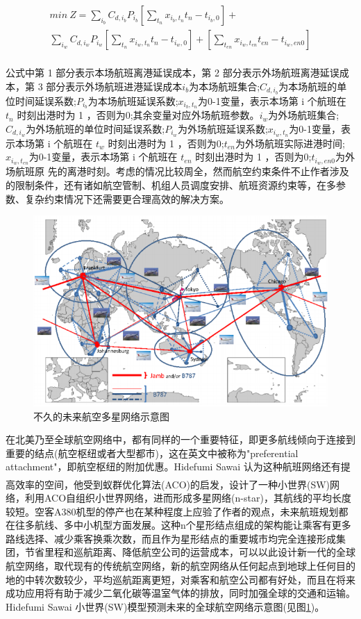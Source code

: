\documentclass[runningheads]{llncs}
\newcommand{\upcite}[1]{\textsuperscript{\textsuperscript{\cite{#1}}}}
\begin{document}
\begin{multline*}
   min\ Z = \sum_{i_b}C_{d,i_b}P_{i_b}\left[\sum_{t_n}x_{i_b,t_n}t_n-t_{i_b,0}\right]+ \\ \sum_{i_w}C_{d,i_w}P_{i_w}\left[\sum_{t_n}x_{i_w,t_n}t_n-t_{i_w,0}\right]+\left[\sum_{t_{en}}x_{i_w,t_{en}}t_{en}-t_{i_w,en0}\right] \\
\end{multline*}  

公式中第 1 部分表示本场航班离港延误成本，第 2 部分表示外场航班离港延误成本，第 3 部分表示外场航班进港延误成本$i_b$为本场航班集合;$C_{d,i_b}$为本场航班的单位时间延误系数;$P_{i_b}$为本场航班延误系数;$x_{i_b,t_n}$为0-1变量，表示本场第 i 个航班在 $t_n$ 时刻出港时为 1 ，否则为0;其余变量对应外场航班参数。$i_w$为外场航班集合;$C_{d,i_w}$为外场航班的单位时间延误系数;$P_{i_w}$为外场航班延误系数;$x_{i_w,t_n}$为0-1变量，表示本场第 i 个航班在 $t_w$ 时刻出港时为 1 ，否则为0;$t_{en}$为外场航班实际进港时间;$x_{i_w,t_{en}}$为0-1变量，表示本场第 i 个航班在 $t_{en}$ 时刻出港时为 1 ，否则为0;$t_{i_w,en0}$为外场航班原 先的离港时刻。考虑的情况比较周全，然而航空约束条件不止作者涉及的限制条件，还有诸如航空管制、机组人员调度安排、航班资源约束等，在多参数、复杂约束情况下还需要更合理高效的解决方案。

\begin{figure}[ht]
\centering
\includegraphics[scale=0.8]{nstar.png}
\caption{不久的未来航空多星网络示意图}
\label{fig1}
\end{figure}

在北美乃至全球航空网络中，都有同样的一个重要特征，即更多航线倾向于连接到重要的结点(航空枢纽或者大型都市)，这在英文中被称为"preferential attachment"，即航空枢纽的附加优惠。Hidefumi Sawai 认为这种航班网络还有提高效率的空间\upcite{ref_article9}，他受到蚁群优化算法(ACO)的启发，设计了一种小世界(SW)网络，利用ACO自组织小世界网络，进而形成多星网络(n-star)，其航线的平均长度较短。空客A380机型的停产也在某种程度上应验了作者的观点，未来航班规划都在往多航线、多中小机型方面发展。这种n个星形结点组成的架构能让乘客有更多路线选择、减少乘客换乘次数，而且作为星形结点的重要城市均完全连接形成集团，节省里程和巡航距离、降低航空公司的运营成本，可以以此设计新一代的全球航空网络，取代现有的传统航空网络，新的航空网络从任何起点到地球上任何目的地的中转次数较少，平均巡航距离更短，对乘客和航空公司都有好处，而且在将来成功应用将有助于减少二氧化碳等温室气体的排放，同时加强全球的交通和运输。Hidefumi Sawai 小世界(SW)模型预测未来的全球航空网络示意图(见图\ref{fig1})。
\end{document}
